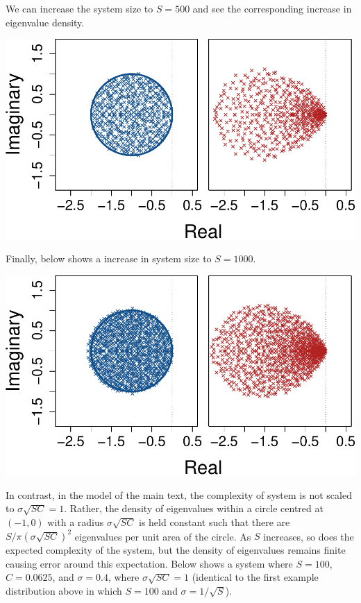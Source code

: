\documentclass[]{article}
\begin{document}
We can increase the system size to \(S = 500\) and see the corresponding
increase in eigenvalue density.

\includegraphics{SI_files/figure-latex/unnamed-chunk-32-1.pdf}

Finally, below shows a increase in system size to \(S = 1000\).

\includegraphics{SI_files/figure-latex/unnamed-chunk-33-1.pdf}

In contrast, in the model of the main text, the complexity of system is
not scaled to \(\sigma\sqrt{SC} = 1\). Rather, the density of
eigenvalues within a circle centred at \((-1, 0)\) with a radius
\(\sigma\sqrt{SC}\) is held constant such that there are
\(S / \pi(\sigma\sqrt{SC})^2\) eigenvalues per unit area of the circle.
As \(S\) increases, so does the expected complexity of the system, but
the density of eigenvalues remains finite causing error around this
expectation. Below shows a system where \(S = 100\), \(C = 0.0625\), and
\(\sigma = 0.4\), where \(\sigma \sqrt{SC} = 1\) (identical to the first
example distribution above in which \(S = 100\) and
\(\sigma = 1/\sqrt{S}\)).
\end{document}
